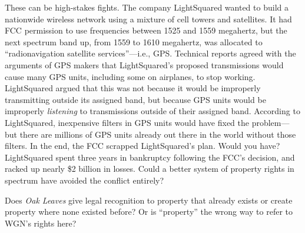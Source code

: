These can be high-stakes fights. The company LightSquared wanted to build a
nationwide wireless network using a mixture of cell towers and satellites. It
had FCC permission to use frequencies between 1525 and 1559 megahertz, but the
next spectrum band up, from 1559 to 1610 megahertz, was allocated to
``radionavigation satellite services''---i.e., GPS. Technical reports agreed
with the arguments of GPS makers that LightSquared's proposed transmissions
would cause many GPS units, including some on airplanes, to stop working.
LightSquared argued that this was not because it would be improperly
transmitting outside its assigned band, but because GPS units would be
improperly \textit{listening} to transmissions outside of their assigned band.
According to LightSquared, inexpensive filters in GPS units would have fixed
the problem---but there are millions of GPS units already out there in the
world without those filters. In the end, the FCC scrapped LightSquared's plan.
Would you have? LightSquared spent three years in bankruptcy following the
FCC's decision, and racked up nearly \$2 billion in losses. Could a better
system of property rights in spectrum have avoided the conflict entirely?

\item Does \textit{Oak Leaves} give legal recognition to property that already
exists or create property where none existed before? Or is ``property'' the
wrong way to refer to WGN's rights here?

